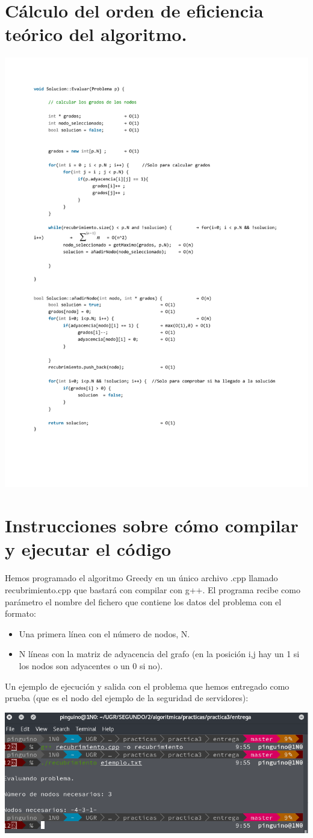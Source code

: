 \documentclass[a4paper, 11pt]{article}
\begin{document}
\section{Cálculo del orden de eficiencia teórico del algoritmo.}
\includegraphics[width=1.2\textwidth]{eficienciaGreedy.pdf}

\section{Instrucciones sobre cómo compilar y ejecutar el código}

Hemos programado el algoritmo Greedy en un único archivo .cpp llamado recubrimiento.cpp que bastará con compilar con g++.
El programa recibe como parámetro el nombre del fichero que contiene los datos del problema con el formato:
\begin{itemize}
	\item Una primera línea con el número de nodos, N.
	\item N líneas con la matriz de adyacencia del grafo (en la posición i,j hay un 1 si los nodos son adyacentes o un 0 si no).
\end{itemize}

Un ejemplo de ejecución y salida con el problema que hemos entregado como prueba (que es el nodo del ejemplo de la seguridad de servidores):


\includegraphics[width=\textwidth]{pantallazo.png}
\end{document}
